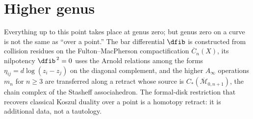 \chapter{Higher genus}
\label{chap:higher-genus}\label{ch:higher-genus}


\providecommand{\BRST}{\mathrm{BRST}}
\providecommand{\SpCh}{\mathrm{Sp}^{\mathrm{ch}}}
\providecommand{\PhiFA}{\Phi^{\mathrm{FA}}}

Everything up to this point takes place at genus zero; but
genus zero on a curve is not the same as ``over a point.''
The bar differential $\dfib$ is constructed from collision
residues on the Fulton--MacPherson compactification
$\overline{C}_n(X)$, its nilpotency $\dfib^{\,2} = 0$ uses
the Arnold relations among the forms
$\eta_{ij} = d\log(z_i - z_j)$ on the diagonal complement,
and the higher $A_\infty$ operations $m_n$ for $n \geq 3$ are
transferred along a retract whose source is
$C_*(\overline{\mathcal{M}}_{0,n+1})$, the chain complex of the
Stasheff associahedron. The formal-disk restriction that recovers
classical Koszul duality over a point is a homotopy retract: it is
additional data, not a tautology.

